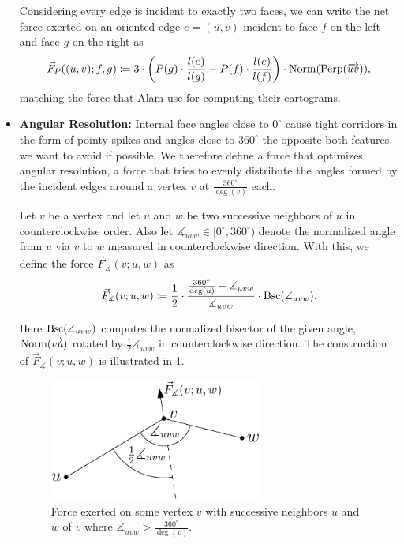 \begin{itemize}
Considering every edge is incident to exactly two faces, we can write the net force exerted on an oriented edge $e = (u,v)$ incident to face $f$ on the left and face $g$ on the right as
%
\begin{equation*}
	\vec{F}_P((u,v);f,g) \coloneqq
	3 \cdot \left( P(g)\cdot\frac{l(e)}{l(g)} - P(f)\cdot\frac{l(e)}{l(f)} \right)
	\cdot \operatorname{Norm}(\operatorname{Perp}(\overrightarrow{uv}))
	,
\end{equation*}
%
matching the force that Alam \etal{} \cite{alam2013computing} use for computing their cartograms.


\item \textbf{Angular Resolution:} %
Internal face angles close to $0^\circ$ cause tight corridors in the form of pointy spikes and angles close to $360^\circ$ the opposite \emdash{} both features we want to avoid if possible.
We therefore define a force that optimizes angular resolution, \ie{} a force that tries to evenly distribute the angles formed by the incident edges around a vertex $v$ at $\frac{360^\circ}{\deg(v)}$ each.

Let $v$ be a vertex and let $u$ and $w$ be two successive neighbors of $u$ in counterclockwise order.
Also let $\measuredangle_{uvw} \in \lbrack 0^\circ, 360^\circ )$ denote the normalized angle from $u$ via $v$ to $w$ measured in counterclockwise direction.
With this, we define the force $\vec{F}_\measuredangle(v;u,w)$ as
%
\begin{equation}
	\vec{F}_\measuredangle(v;u,w) \coloneqq
	\frac{1}{2} \cdot \frac{\frac{360^\circ}{\deg(u)} - \measuredangle_{uvw}}{\measuredangle_{uvw}}
	\cdot \operatorname{Bsc}(\angle_{uvw})
	.
\end{equation}

Here $\operatorname{Bsc}(\angle_{uvw})$ computes the normalized bisector of the given angle, \ie{} $\operatorname{Norm}(\overrightarrow{vu})$ rotated by $\frac{1}{2} \measuredangle_{uvw}$ in counterclockwise direction.
The construction of $\vec{F}_\measuredangle(v;u,w)$ is illustrated in \cref{fig:drawing-forces-angular-resolution}.

\begin{figure}[H]
	\centering
	\includegraphics[height=40mm]{Resources/Drawing-Forces-AngularResolution.pdf}
	\caption{Force exerted on some vertex $v$ with successive neighbors $u$ and $w$ of $v$ where $\measuredangle_{uvw} > \frac{360^\circ}{\deg(v)}$.}
	\label{fig:drawing-forces-angular-resolution}
\end{figure}


\end{itemize}
